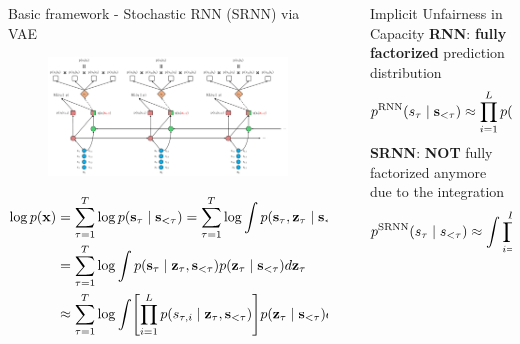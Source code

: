 \documentclass[final]{beamer}
\newlength{\sepwidth}
\newlength{\colwidth}
\newcommand{\separatorcolumn}{\begin{column}{\sepwidth}\end{column}}
\begin{document}
\begin{frame}[t]
\begin{columns}[t]
\begin{column}{\colwidth}
  \begin{block}{Basic framework - Stochastic RNN (SRNN) via VAE}
	\begin{figure}
	\includegraphics[width=0.85\linewidth]{fig/SRNN-L4-ELBO.pdf} %
	\end{figure}
	\vspace{-1em}
	\begin{align*}
	\log p(\rvx) 
	&= \sum_{\tau=1}^{T} \log p(\rvs_{\tau} \mid \rvs_{<\tau}) 
	= \sum_{\tau=1}^{T} \log \int p(\rvs_{\tau}, \rvz_\tau \mid \rvs_{<\tau}) d\rvz_\tau && \text{(add $\rvz_\tau$ for each $\rvs_\tau$)} \\
	&= \sum_{\tau=1}^{T} \log \int p(\rvs_{\tau} \mid \rvz_\tau , \rvs_{<\tau}) p(\rvz_\tau \mid \rvs_{<\tau}) d\rvz_\tau && \text{(product rule)} \\
	&\approx \sum_{\tau=1}^{T} \log \int \sbr{ \prod_{i=1}^{L} p(s_{\tau,i} \mid \rvz_\tau , \rvs_{<\tau}) } p(\rvz_\tau \mid \rvs_{<\tau}) d\rvz_\tau && \text{(factorized)}
	\end{align*}
\end{block}
\end{column}

\separatorcolumn

\begin{column}{\colwidth}


\begin{block}{Implicit Unfairness in Capacity}
 	\textbf{RNN}: \textbf{fully factorized} prediction distribution
 	\[ 
 		p^\text{RNN}(s_{\tau} \mid {\mathbf{s}}_{<\tau}) \approx \prod_{i=1}^{L} p(s_{\tau,i} \mid {\mathbf{s}}_{<\tau})
 	\]
 	\textbf{SRNN}: \textbf{NOT} fully factorized anymore due to the integration
 	\[
 		p^\text{SRNN}(s_{\tau} \mid s_{<\tau}) \approx \int  \prod_{i=1}^{L} p(s_{\tau,i} \mid {\mathbf{s}}_{<\tau}, {\mathbf{z}}_\tau) p({\mathbf{z}}_\tau \mid {\mathbf{s}}_{< \tau}) d {\mathbf{z}}_\tau
 	\]
 	

\end{block}
\end{column}
\end{columns}
\end{frame}
\end{document}
